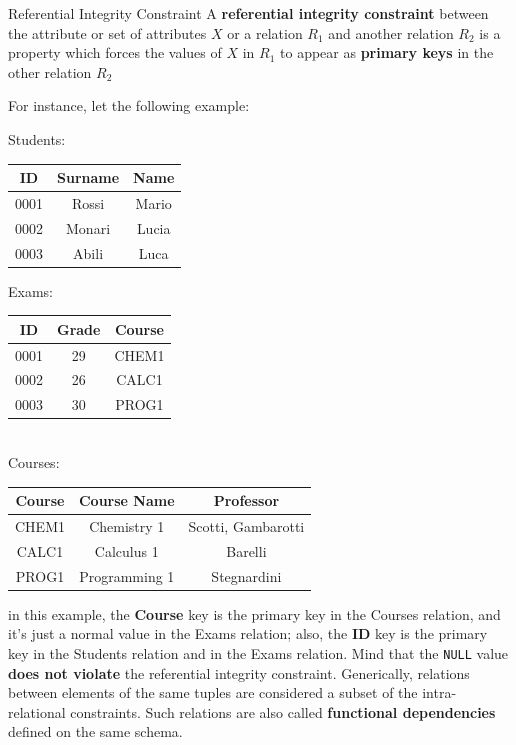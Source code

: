 \begin{definition}{Referential Integrity Constraint}
    A \textbf{referential integrity constraint} between the attribute or set of attributes $X$ or a relation $R_1$ and another relation $R_2$ is a property which forces the values of $X$ in $R_1$ to appear as \textbf{primary keys} in the other relation $R_2$
\end{definition}

For instance, let the following example:
\begin{center}
    Students: \quad
    \begin{tabular}{|c|c|c|}
        \hline \rowcolor{maindoccol!60}
        \textbf{ID} & \textbf{Surname} & \textbf{Name} \\
        \hline
        0001 & Rossi & Mario \\
        \hline
        0002 & Monari & Lucia \\
        \hline
        0003 & Abili & Luca \\
        \hline
    \end{tabular}
    \hspace{25pt}
    Exams: \quad
    \begin{tabular}{|c|c|c|}
        \hline \rowcolor{maindoccol!60}
        \textbf{ID} & \textbf{Grade} & \textbf{Course} \\
        \hline
        0001 & 29 & CHEM1 \\
        \hline
        0002 & 26 & CALC1 \\
        \hline
        0003 & 30 & PROG1 \\
        \hline
    \end{tabular}
    \\
    \vspace{12pt}
    Courses: \quad \begin{tabular}{|c|c|c|}
        \hline \rowcolor{maindoccol!60}
        \textbf{Course} & \textbf{Course Name} & \textbf{Professor} \\
        \hline
        CHEM1 & Chemistry 1 & Scotti, Gambarotti \\
        \hline
        CALC1 & Calculus 1 & Barelli \\
        \hline
        PROG1 & Programming 1 & Stegnardini \\
        \hline
    \end{tabular}
\end{center}

in this example, the \textbf{Course} key is the primary key in the Courses relation, and it's just a normal value in the Exams relation; also, the \textbf{ID} key is the primary key in the Students relation and in the Exams relation. Mind that the \texttt{NULL} value \textbf{does not violate} the referential integrity constraint.
\nwl
Generically, relations between elements of the same tuples are considered a subset of the intra-relational constraints. Such relations are also called \textbf{functional dependencies} defined on the same schema.

